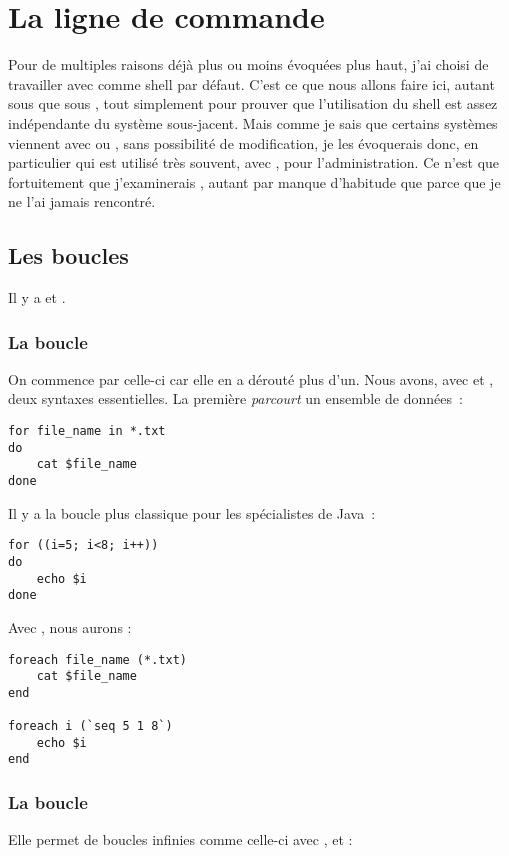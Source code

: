 
\section{La ligne de commande}
Pour de multiples raisons déjà plus ou moins évoquées plus haut, j'ai choisi de travailler avec \zsh{} comme shell par défaut. C'est ce que nous allons faire ici, autant sous \freebsd{} que sous \linux{}, tout simplement pour prouver que l'utilisation du shell est assez indépendante du système sous-jacent. Mais comme je sais que certains systèmes viennent avec \bash{} ou \tcsh{}, sans possibilité de modification, je les évoquerais donc, en particulier \tcsh{} qui est utilisé très souvent, avec \csh{}, pour l'administration. Ce n'est que fortuitement que j'examinerais \ksh{}, autant par manque d'habitude que parce que je ne l'ai jamais rencontré.

\subsection{Les boucles}
Il y a  et .

\subsubsection{La boucle }
On commence par celle-ci car elle en a dérouté plus d'un. Nous avons, avec \zsh{} et \bash, deux syntaxes essentielles. La première \emph{parcourt} un ensemble de données :

\begin{lstlisting}[caption=une boucle for]
for file_name in *.txt
do
	cat $file_name
done
\end{lstlisting}

Il y a la boucle plus classique pour les spécialistes de Java :

\begin{lstlisting}[caption=une boucle for comme en Java]
for ((i=5; i<8; i++))
do
	echo $i
done
\end{lstlisting}

Avec \tcsh{}, nous aurons :

\begin{lstlisting}[caption=parcours d'une liste avec tcsh]
foreach file_name (*.txt)
	cat $file_name
end

foreach i (`seq 5 1 8`)
	echo $i
end
\end{lstlisting}


\subsubsection{La boucle }
Elle permet de boucles infinies comme celle-ci avec \zsh{}, \bash{} et \ksh{} :

